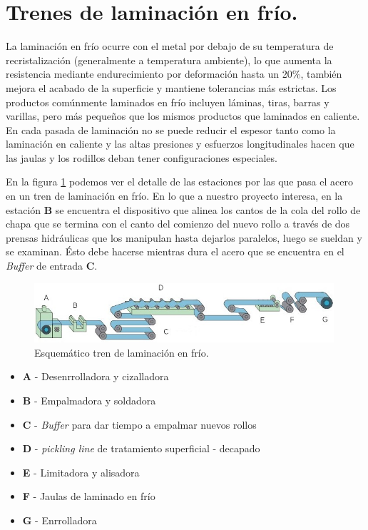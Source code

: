 \section{Trenes de laminación en frío.}\label{cap:MetBas}
La laminación en frío ocurre con el metal por debajo de su temperatura de recristalización (generalmente a temperatura ambiente), lo que aumenta la resistencia mediante endurecimiento por deformación hasta un 20\%, también mejora el acabado de la superficie y mantiene tolerancias más estrictas. Los productos comúnmente laminados en frío incluyen láminas, tiras, barras y varillas, pero más pequeños que los mismos productos que laminados en caliente. En cada pasada de laminación no se puede reducir el espesor tanto como la laminación en caliente y las altas presiones y esfuerzos longitudinales hacen que las jaulas y los rodillos deban tener configuraciones especiales.

En la figura \ref{fig:tren_frio_01} podemos ver el detalle de las estaciones por las que pasa el acero en un tren de laminación en frío. En lo que a nuestro proyecto interesa, en la estación \textbf{B} se encuentra el dispositivo que alinea los cantos de la cola del rollo de chapa que se termina con el canto del comienzo del nuevo rollo a través de dos prensas hidráulicas que los manipulan hasta dejarlos paralelos, luego se sueldan y se examinan. Ésto debe hacerse mientras dura el acero que se encuentra en el \textit{Buffer} de entrada \textbf{C}.

\begin{figure}[h]
	\centering
	\includegraphics[width=0.99\textwidth]{./Figures/tren_frio_01.jpg}
	\caption{Esquemático tren de laminación en frío.}
	\label{fig:tren_frio_01}
\end{figure}


\begin{itemize}
	\item \textbf{A} - Desenrrolladora y cizalladora
	\item \textbf{B} - Empalmadora y soldadora
	\item \textbf{C} - \textit{Buffer} para dar tiempo a empalmar nuevos rollos
	\item \textbf{D} - \textit{pickling line} de tratamiento superficial - decapado
	\item \textbf{E} - Limitadora y alisadora
	\item \textbf{F} - Jaulas de laminado en frío
	\item \textbf{G} - Enrrolladora
\end{itemize}

